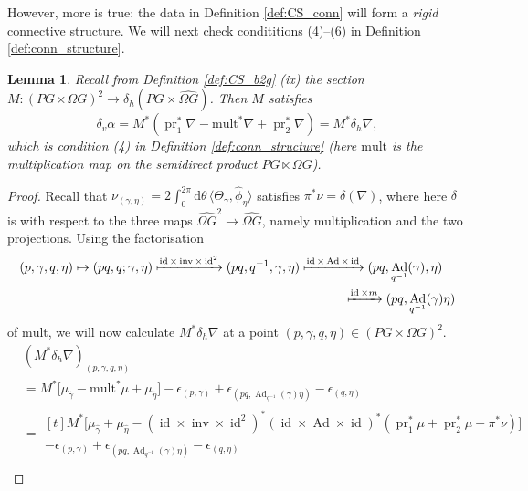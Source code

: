 \documentclass[12pt]{amsart}
\DeclareMathOperator{\id}{id}
\DeclareMathOperator{\Ad}{Ad}
\DeclareMathOperator{\pr}{pr}
\theoremstyle{plain}
\newtheorem{lemma}[theorem]{Lemma}
\theoremstyle{definition}
\theoremstyle{remark}
\numberwithin{equation}{section}
\newcommand{\mult}{\mathrm{mult}}
\newcommand{\<}{\langle}
\renewcommand{\>}{\rangle}
\newcommand{\intSone}{\int_{0}^{2\pi}\mathrm{d}\theta\,}
\newcommand{\Omegahat}[1]{\widehat{\Omega #1}}
\newcommand{\phihat}{\widehat{\phi}}
\DeclareMathOperator{\inv}{inv}
\begin{document}
However, more is true: the data in Definition \ref{def:CS_conn} will form a \emph{rigid} connective structure. We will next check condititions (4)--(6) in Definition \ref{def:conn_structure}.

\begin{lemma}\label{lemma: delta_h a = delta_v alpha}
Recall from Definition \ref{def:CS_b2g} (ix) the section $M\colon (PG\ltimes \Omega G)^2 \to \delta_h(PG\times \Omegahat{G})$. Then $M$ satisfies
\[
  \delta_v\alpha = M^*(\pr_1^*\nabla - \mult^*\nabla + \pr_2^*\nabla)= M^*\delta_h \nabla,
\]
which is condition (4) in Definition \ref{def:conn_structure} (here $\mult$ is the multiplication map on the semidirect product $PG\ltimes \Omega G$).
\end{lemma}


\begin{proof}
Recall that $\nu_{(\gamma,\eta)}= 2\intSone\langle\Theta_\gamma,\phihat_\eta\rangle$ satisfies $\pi^*\nu = \delta(\nabla)$, where here $\delta$ is with respect to the three maps $\widehat{\Omega G}^2 \to \widehat{\Omega G}$, namely multiplication and the two projections.
Using the factorisation 
\begin{equation}\label{eq:semidirect_prod_mult}
  \begin{multlined}[t]
  (p,\gamma,q,\eta) \mapsto (pq,q;\gamma,\eta) \xmapsto{\id\times\inv\times\id^2} (pq,q^{-1},\gamma,\eta) \xmapsto{\id\times \Ad\times \id} (pq,\Ad_{q^{-1}}(\gamma),\eta) \\ \xmapsto{\id\times m} (pq,\Ad_{q^{-1}}(\gamma)\eta) \end{multlined}
\end{equation}
of $\mult$, we will now calculate $M^*\delta_h \nabla$ at a point $(p,\gamma,q,\eta)\in (PG\times \Omega G)^2$. 
\begin{align*}
  &(M^*\delta_h \nabla)_{(p,\gamma,q,\eta)} \\
  & = M^*\big[\mu_{\hat\gamma} - \mult^*\mu + \mu_{\hat\eta}\big] - \epsilon_{(p,\gamma)} + \epsilon_{(pq,\Ad_{q^{-1}}(\gamma)\eta)} - \epsilon_{(q,\eta)}\\
  & = \begin{multlined}[t]
    M^*\big[\mu_{\hat\gamma} + \mu_{\hat\eta} - (\id\times \inv\times \id^2)^*(\id\times \Ad \times \id)^*(\pr_1^*\mu + \pr_2^*\mu - \pi^*\nu)\big]\\
    - \epsilon_{(p,\gamma)} 
    + \epsilon_{(pq,\Ad_{q^{-1}}(\gamma)\eta)} - \epsilon_{(q,\eta)}
    \end{multlined}\\

\end{align*}
\end{proof}
\end{document}
